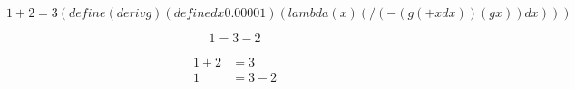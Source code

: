 \documentclass{article}
\begin{document}
\begin{equation*}
  1 + 2 = 3

 (define (deriv g)
  (define dx 0.00001)
  (lambda (x) (/ (- (g (+ x dx))
                    (g x))
                 dx)))
\end{equation*}

\begin{equation*}
  1 = 3 - 2
\end{equation*}

\begin{align*}
  1 + 2 &= 3\\
  1 &= 3 - 2
\end{align*}
\end{document}
